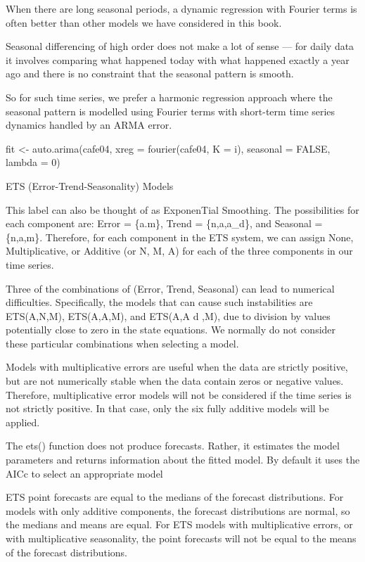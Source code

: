 \documentclass[]{book}
\begin{document}
When there are long seasonal periods, a dynamic regression with Fourier
terms is often better than other models we have considered in this book.

Seasonal differencing of high order does not make a lot of sense --- for
daily data it involves comparing what happened today with what happened
exactly a year ago and there is no constraint that the seasonal pattern
is smooth.

So for such time series, we prefer a harmonic regression approach where
the seasonal pattern is modelled using Fourier terms with short-term
time series dynamics handled by an ARMA error.

fit \textless{}- auto.arima(cafe04, xreg = fourier(cafe04, K = i),
seasonal = FALSE, lambda = 0)

ETS (Error-Trend-Seasonality) Models

This label can also be thought of as ExponenTial Smoothing. The
possibilities for each component are: Error = \{a.m\}, Trend =
\{n,a,a\_d\}, and Seasonal = \{n,a,m\}. Therefore, for each component in
the ETS system, we can assign None, Multiplicative, or Additive (or N,
M, A) for each of the three components in our time series.

Three of the combinations of (Error, Trend, Seasonal) can lead to
numerical difficulties. Specifically, the models that can cause such
instabilities are ETS(A,N,M), ETS(A,A,M), and ETS(A,A d ,M), due to
division by values potentially close to zero in the state equations. We
normally do not consider these particular combinations when selecting a
model.

Models with multiplicative errors are useful when the data are strictly
positive, but are not numerically stable when the data contain zeros or
negative values. Therefore, multiplicative error models will not be
considered if the time series is not strictly positive. In that case,
only the six fully additive models will be applied.

The ets() function does not produce forecasts. Rather, it estimates the
model parameters and returns information about the fitted model. By
default it uses the AICc to select an appropriate model

ETS point forecasts are equal to the medians of the forecast
distributions. For models with only additive components, the forecast
distributions are normal, so the medians and means are equal. For ETS
models with multiplicative errors, or with multiplicative seasonality,
the point forecasts will not be equal to the means of the forecast
distributions.
\end{document}
